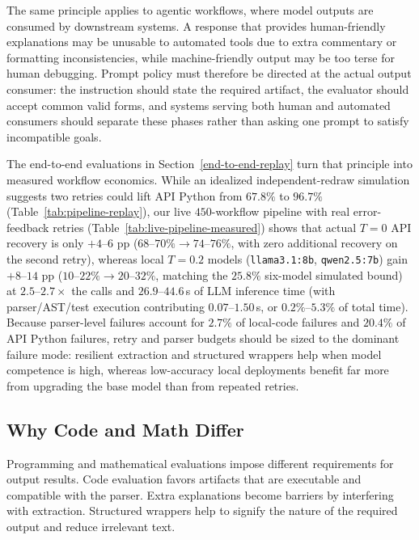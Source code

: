 \documentclass[a4paper,fleqn]{cas-sc}
\begin{document}
The same principle applies to agentic workflows, where model outputs are consumed by downstream systems. A response that provides human-friendly explanations may be unusable to automated tools due to extra commentary or formatting inconsistencies, while machine-friendly output may be too terse for human debugging. Prompt policy must therefore be directed at the actual output consumer: the instruction should state the required artifact, the evaluator should accept common valid forms, and systems serving both human and automated consumers should separate these phases rather than asking one prompt to satisfy incompatible goals.

The end-to-end evaluations in Section~\ref{end-to-end-replay} turn that principle into measured workflow economics. While an idealized independent-redraw simulation suggests two retries could lift API Python from $67.8\%$ to $96.7\%$ (Table~\ref{tab:pipeline-replay}), our live $450$-workflow pipeline with real error-feedback retries (Table~\ref{tab:live-pipeline-measured}) shows that actual $T = 0$ API recovery is only $+4$--$6$ pp ($68$--$70\% \to 74$--$76\%$, with zero additional recovery on the second retry), whereas local $T = 0.2$ models (\texttt{llama3.1:8b}, \texttt{qwen2.5:7b}) gain $+8$--$14$ pp ($10$--$22\% \to 20$--$32\%$, matching the $25.8\%$ six-model simulated bound) at $2.5$--$2.7\times$ the calls and $26.9$--$44.6$\,s of LLM inference time (with parser/AST/test execution contributing $0.07$--$1.50$\,s, or $0.2\%$--$5.3\%$ of total time). Because parser-level failures account for $2.7\%$ of local-code failures and $20.4\%$ of API Python failures, retry and parser budgets should be sized to the dominant failure mode: resilient extraction and structured wrappers help when model competence is high, whereas low-accuracy local deployments benefit far more from upgrading the base model than from repeated retries.

\subsection{Why Code and Math Differ}\label{why-code-and-math-differ}

Programming and mathematical evaluations impose different requirements for output results. Code evaluation favors artifacts that are executable and compatible with the parser. Extra explanations become barriers by interfering with extraction. Structured wrappers help to signify the nature of the required output and reduce irrelevant text.
\end{document}
